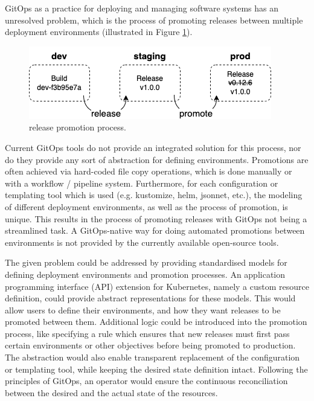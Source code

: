 GitOps as a practice for deploying and managing software systems has an unresolved problem, which is
the process of promoting releases between multiple deployment environments (illustrated in Figure \ref{fig:releasePromotionProcess}).

\begin{figure}[h]
	\centering
	\includegraphics[width=.55\linewidth]{figures/release-promotion.drawio.png}
	\caption{release promotion process.
	}
	\label{fig:releasePromotionProcess}	
\end{figure}

Current GitOps tools do not provide an integrated solution for this process,
nor do they provide any sort of abstraction for defining environments.
Promotions are often achieved via hard-coded file copy operations,
which is done manually or with a workflow / pipeline system.
Furthermore, for each configuration or templating tool which is used
(e.g. kustomize, helm, jsonnet, etc.),
the modeling of different deployment environments, as well as the
process of promotion, is unique.
This results in the process of promoting releases with GitOps
not being a streamlined task.
A GitOps-native way for doing automated promotions between environments is
not provided by the currently available open-source tools.


%
The given problem could be addressed by
providing standardised models 
for defining deployment environments and promotion processes.
%
An application programming interface (API) extension for Kubernetes,
namely a custom resource definition,
could provide abstract representations for these models.
%
This would allow users to define
their environments,
and how they want releases to be promoted between them.
%
Additional logic could be introduced into the promotion process,
like specifying a rule which ensures that new releases must first pass
certain environments or other objectives before being promoted to production.
%
The abstraction would also enable transparent replacement of the
configuration or templating tool,
while keeping the desired state definition intact.
%
Following the principles of GitOps,
an operator would ensure the continuous reconciliation
between the desired and the actual state of the resources.

